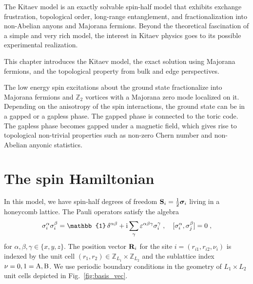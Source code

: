 

The Kitaev model \cite{Kitaev2006} is an exactly solvable spin-half model that exhibits exchange frustration, topological order, long-range entanglement, and fractionalization into non-Abelian anyons and  Majorana fermions.
Beyond the theoretical fascination of a simple and very rich model, the interest in Kitaev physics goes to its possible experimental realization.


This chapter introduces the Kitaev model, the exact solution using Majorana fermions, and the topological property from bulk and edge perspectives.

The low energy spin excitations about the ground state fractionalize into Majorana fermions and $\mathbb{Z}_2$ vortices with a Majorana zero mode localized on it. Depending on the anisotropy of the spin interactions, the ground state can be in a gapped or a gapless phase.
The gapped phase is connected to the toric code.
The gapless phase becomes gapped under a magnetic field, which gives rise to topological non-trivial properties such as non-zero Chern number and non-Abelian anyonic statistics.




\section{The spin Hamiltonian}
In this model, we have spin-half degrees of freedom $\mathbf{S}_i=\frac{1}{2}\bm{\sigma}_i$ living in a honeycomb lattice.
The Pauli operators satisfy the algebra
\begin{equation}
    \sigma_i^\alpha \sigma_i^\beta = \mathbb{1} \, \delta^{\alpha\beta} + \im \sum_\gamma \varepsilon^{\alpha\beta\gamma} \sigma_i^\gamma \; , \quad [\sigma_i^\alpha ,  \sigma_j^\beta] = 0 \; ,
\end{equation}
for $\alpha,\beta,\gamma \in \{x,y,z\}$.
The position vector $\mathbf{R}_{i}$ for the site $i=(r_{i1},r_{i2},\nu_i)$ is indexed by the unit cell  $(r_{1},r_{2}) \in \mathbb{Z}_{L_1}\times\mathbb{Z}_{L_2}$ and the sublattice index $\nu=0,1=\mathrm{A},\mathrm{B}$. We use periodic boundary conditions in the geometry of $L_1\times L_2$ unit cells depicted in Fig.~\ref{fig:basis_vec}.

